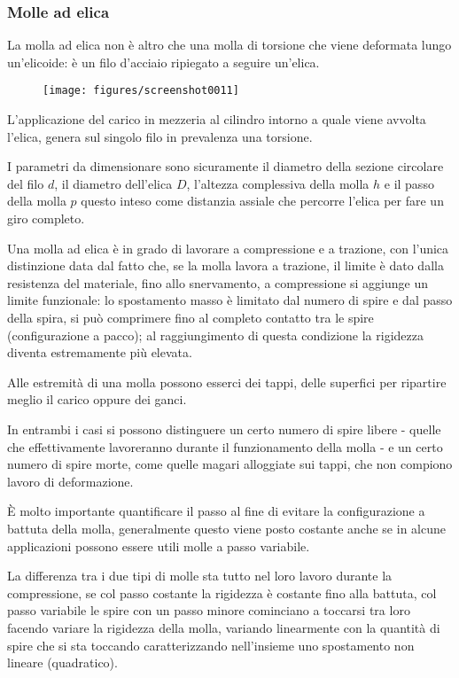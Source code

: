 \documentclass[a4paper, 15pt]{article}
\begin{document}
\subsubsection{Molle ad elica}
\begin{adjustwidth}{2in}{}
La molla ad elica non è altro che una molla di torsione che viene deformata lungo un'elicoide: è un filo d'acciaio ripiegato a seguire un'elica. 
\begin{figure}[H]
	\centering
	\texttt{[image: figures/screenshot0011]}
	\label{fig:screenshot0011}
\end{figure}
L'applicazione del carico in mezzeria al cilindro intorno a quale viene avvolta l'elica, genera sul singolo filo in prevalenza una torsione. \newline 

I parametri da dimensionare sono sicuramente il diametro della sezione circolare del filo $d$, il diametro dell'elica $D$, l'altezza complessiva della molla $h$ e il passo della molla $p$ questo inteso come distanzia assiale che percorre l'elica per fare un giro completo. \newline 

Una molla ad elica è in grado di lavorare a compressione e a trazione, con l'unica distinzione data dal fatto che, se la molla lavora a trazione, il limite è dato dalla resistenza del materiale, fino allo snervamento, a compressione si aggiunge un limite funzionale: lo spostamento masso è limitato  dal numero di spire e dal passo della spira, si può comprimere fino al completo contatto tra le spire (configurazione a pacco); al raggiungimento di questa condizione la rigidezza diventa estremamente più elevata. 

Alle estremità di una molla possono esserci dei tappi, delle superfici per ripartire meglio il carico oppure dei ganci. 

In entrambi i casi si possono distinguere un certo numero di spire libere - quelle che effettivamente lavoreranno durante il funzionamento della molla - e un certo numero di spire morte, come quelle magari alloggiate sui tappi, che non compiono lavoro di deformazione. \newline 

È molto importante quantificare il passo al fine di evitare la configurazione a battuta della molla, generalmente questo viene posto costante anche se in alcune applicazioni possono essere utili molle a passo variabile. 

La differenza tra i due tipi di molle sta tutto nel loro lavoro durante la compressione, se col passo costante la rigidezza è costante fino alla battuta, col passo variabile le spire con un passo minore cominciano a toccarsi tra loro facendo variare la rigidezza della molla, variando linearmente con la quantità di spire che si sta toccando caratterizzando nell'insieme uno spostamento non lineare (quadratico).  \newline 


\end{adjustwidth}
\end{document}

